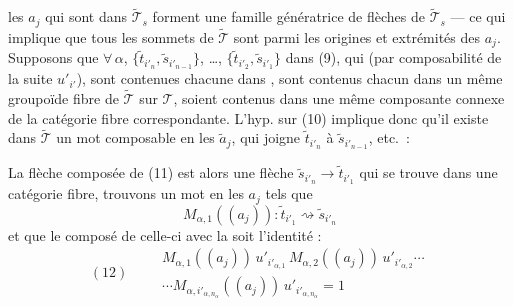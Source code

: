 \documentclass[11pt,a4paper]{article}
\begin{document}
les $a_j$ qui sont dans $\widetilde{\mathcal{T}}_s$ forment une famille génératrice de flèches
de $\widetilde{\mathcal{T}}_s$ — ce qui implique que tous les sommets de
$\widetilde{\mathcal{T}}$ sont parmi les \struck{\ill{}} origines et extrémités des $a_j$.
 Supposons que $\forall\, \alpha$, 
$\{\tilde{t}_{i'_n}, \tilde{s}_{i'_{n-1}}\}$, \ldots, $\{\tilde{t}_{i'_2}, \tilde{s}_{i'_1}\}$
dans (9),  qui (par  composabilité de la suite 
$u'_{i'}$), sont contenues chacune  dans , sont contenus
chacun dans un même groupoïde fibre de $\widetilde{\mathcal{T}}$ sur $\mathcal{T}$, soient
contenus dans une même composante connexe de la catégorie fibre correspondante.
L'hyp. sur (10) implique donc qu'il existe dans $\widetilde{\mathcal{T}}$ un mot
\struck{\ill{}} composable en les $\tilde{a}_j$, qui joigne $\tilde{t}_{i'_n}$ à
$\tilde{s}_{i'_{n-1}}$, etc.\ :




La flèche composée de (11) est alors une flèche
$\tilde{s}_{i'_n} \to \tilde{t}_{i'_1}$ qui se trouve dans \struck{\ill{}} une catégorie fibre,
 \ill{} trouvons un mot  en
les $a_j$ tels que 
\[
  M_{\alpha,1}((a_j)) : \tilde{t}_{i'_1} \rightsquigarrow \tilde{s}_{i'_n}
\]
et que le composé de  celle-ci avec la  soit
l'identité :
\[
  (12) \qquad
  \boxed{\begin{gathered}
    M_{\alpha,1}((a_j))\, u'_{i'_{\alpha,1}}\, M_{\alpha,2}((a_j))\, u'_{i'_{\alpha,2}} \cdots \\
    \cdots M_{\alpha,i'_{\alpha,n_\alpha}}((a_j))\, u'_{i'_{\alpha,n_\alpha}} = 1
  \end{gathered}}
\]
\end{document}

